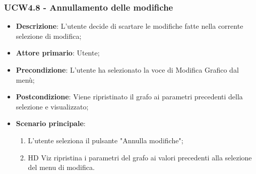 \subsubsection{UCW4.8 - Annullamento delle modifiche}
\label{ssub:ucw4.8}
\begin{itemize}
    \item \textbf{Descrizione}: L'utente decide di scartare le modifiche fatte nella corrente selezione di modifica;

    \item \textbf{Attore primario}: Utente;

    \item \textbf{Precondizione}:   L'utente ha selezionato la voce di Modifica Grafico dal menù;
    \item \textbf{Postcondizione}:  Viene ripristinato il grafo ai parametri precedenti della selezione e visualizzato;

	\item \textbf{Scenario principale}:
        \begin{enumerate}
            \item L'utente seleziona il pulsante "Annulla modifiche";
            \item HD Viz ripristina i parametri del grafo ai valori precedenti alla selezione del menu di modifica.
        \end{enumerate}
\end{itemize}
